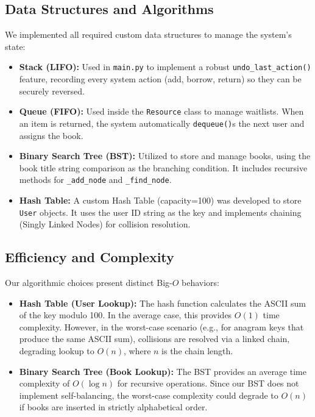 \documentclass[11pt,a4paper]{article}
\begin{document}
\subsection{Data Structures and Algorithms}
We implemented all required custom data structures to manage the system's state:
\begin{itemize}
    \item \textbf{Stack (LIFO):} Used in \texttt{main.py} to implement a robust \texttt{undo\_last\_action()} feature, recording every system action (add, borrow, return) so they can be securely reversed.
    \item \textbf{Queue (FIFO):} Used inside the \texttt{Resource} class to manage waitlists. When an item is returned, the system automatically \texttt{dequeue()}s the next user and assigns the book.
    \item \textbf{Binary Search Tree (BST):} Utilized to store and manage books, using the book title string comparison as the branching condition. It includes recursive methods for \texttt{_add_node} and \texttt{_find_node}.
    \item \textbf{Hash Table:} A custom Hash Table (capacity=100) was developed to store \texttt{User} objects. It uses the user ID string as the key and implements chaining (Singly Linked Nodes) for collision resolution.
\end{itemize}

\subsection{Efficiency and Complexity}
Our algorithmic choices present distinct Big-$O$ behaviors:
\begin{itemize}
    \item \textbf{Hash Table (User Lookup):} The hash function calculates the ASCII sum of the key modulo 100. In the average case, this provides $O(1)$ time complexity. However, in the worst-case scenario (e.g., for anagram keys that produce the same ASCII sum), collisions are resolved via a linked chain, degrading lookup to $O(n)$, where $n$ is the chain length.
    \item \textbf{Binary Search Tree (Book Lookup):} The BST provides an average time complexity of $O(\log n)$ for recursive operations. Since our BST does not implement self-balancing, the worst-case complexity could degrade to $O(n)$ if books are inserted in strictly alphabetical order.
\end{itemize}

\end{document}
